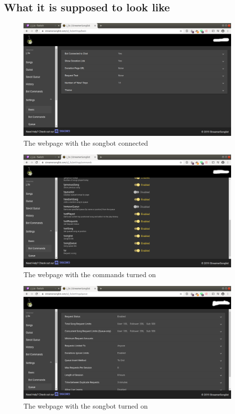 \subsection{What it is supposed to look like}
\begin{figure}[ht!]
  \includegraphics[width=\linewidth]{src/troubleshooting_songbot/bot_connected.png}
  \caption{The webpage with the songbot connected}
  \label{bot disconnected}
\end{figure}
\begin{figure}[ht!]
  \includegraphics[width=\linewidth]{src/troubleshooting_songbot/songlist_commands_on.png}
  \caption{The webpage with the commands turned on}
  \label{commands off}
\end{figure}
\begin{figure}[ht!]
  \includegraphics[width=\linewidth]{src/troubleshooting_songbot/bot_on.png}
  \caption{The webpage with the songbot turned on}
  \label{bot is on}
\end{figure}

